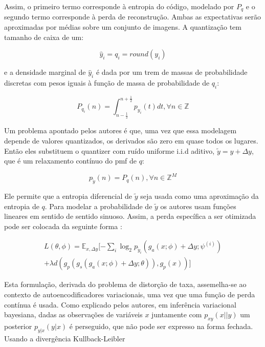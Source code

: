 Assim, o primeiro termo corresponde à entropia do código, modelado por $P_q$ e o segundo termo corresponde à perda de reconstrução. Ambas as expectativas serão aproximadas por médias sobre um conjunto de imagens. A quantização tem tamanho de caixa de um:

\begin{equation}
\hat{y}_i = q_i = round(y_i)
\end{equation}

e a densidade marginal de $\hat{y}_i$ é dada por um trem de massas de probabilidade discretas com pesos iguais à função de massa de probabilidade de $q_i$:

\begin{equation}
P_{q_i} (n) = \int_{n - \frac{1}{2}}^{n + \frac{1}{2}} p_{y_i}(t) dt, \forall n \in \mathbb{Z}
\end{equation}

Um problema apontado pelos autores é que, uma vez que essa modelagem depende de valores quantizados, os derivados são zero em quase todos os lugares. Então eles substituem o quantizer com ruído uniforme i.i.d aditivo, $\tilde{y} = y + \Delta y$, que é um relaxamento contínuo do pmf de $q$:

\begin{equation}
p_{\tilde{y}} (n) = P_q(n), \forall n \in \mathbb{Z}^M
\end{equation}

Ele permite que a entropia diferencial de $\tilde{y}$ seja usada como uma aproximação da entropia de $q$. Para modelar a probabilidade de $\tilde{y}$ os autores usam funções lineares em sentido de sentido sinuoso. Assim, a perda específica a ser otimizada pode ser colocada da seguinte forma \cite{End2016Balle}:

\begin{equation}
\begin{aligned}
L(\theta, \phi) = \mathbb{E}_{x, \Delta y} [ - \sum_{i}^{} \log_2 p_{\tilde{y}_i}(g_a(x; \phi) + \Delta y; \psi^{(i)}) \\
+ \lambda d(g_p(g_s(g_a(x; \phi) + \Delta y; \theta)),g_p(x))] 
\end{aligned}
\end{equation}

Esta formulação, derivada do problema de distorção de taxa, assemelha-se ao contexto de autoencodificadores variacionais, uma vez que uma função de perda contínua é usada. Como explicado pelos autores, em inferência variacional bayesiana, dadas as observações de variáveis $x$ juntamente com $p_{x y}(x||y)$ um posterior $p_{y|x}(y|x)$ é perseguido, que não pode ser expresso na forma fechada. Usando a divergência Kullback-Leibler

